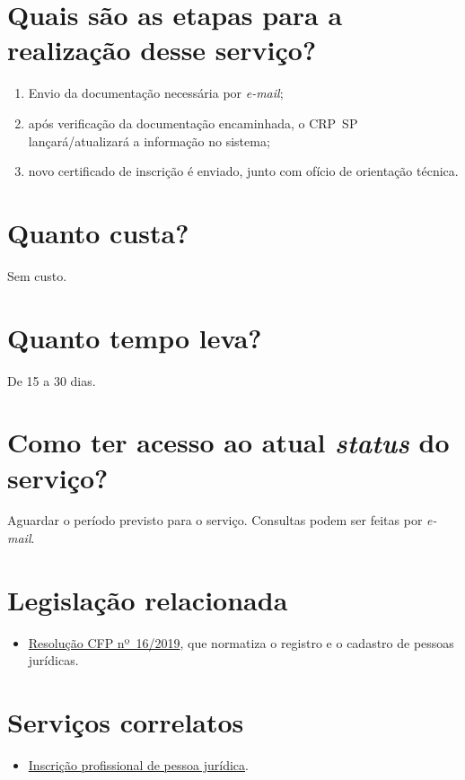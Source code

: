 \section{Quais são as etapas para a realização desse serviço?}

\begin{enumerate}
  \item  Envio da documentação necessária por \emph{e-mail};
  \item  após verificação da documentação encaminhada, o CRP~SP  lançará/atualizará a informação no sistema;
  \item  novo certificado de inscrição é enviado, junto com ofício de  orientação técnica.
\end{enumerate}

\section{Quanto custa?}

Sem custo.

\section{Quanto tempo leva?}

De 15 a 30 dias.

\section{Como ter acesso ao atual \emph{status} do serviço?}

Aguardar o período previsto para o serviço. Consultas podem ser feitas por \emph{e-mail}.

\section{Legislação relacionada}

\begin{itemize}
  \item  \href{https://atosoficiais.com.br/cfp/resolucao-administrativa-financeira-n-16-2019-altera-o-manual-de-procedimentos-administrativo-e-financeiro-do-sistema-conselhos-de-psicologia-anexo-da-resolucao-cfp-n-202018-a-resolucao-cfp-n-03-2007-a-resolucao-cfp-n-16-2019-e-da-outras-providencias}{Resolução  CFP nº~16/2019}, que normatiza o registro e o cadastro de pessoas  jurídicas.
\end{itemize}

\section{Serviços correlatos}

\begin{itemize}
  \item  \hyperref[chap:pj-inscricao]{Inscrição  profissional de pessoa jurídica}.
\end{itemize}

\sumario